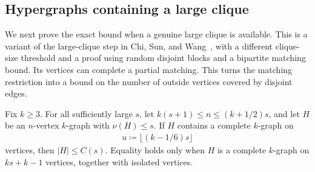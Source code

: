\subsection{Hypergraphs containing a large clique}

We next prove the exact bound when a genuine large clique is available. This is a variant of the large-clique step in Chi, Sun, and Wang~\cite[Lemma 8.7]{CSW2026}, with a different clique-size threshold and a proof using random disjoint blocks and a bipartite matching bound. Its vertices can complete a partial matching. This turns the matching restriction into a bound on the number of outside vertices covered by disjoint edges.
\begin{lemma}\label{lem:local-clique}
Fix $k\ge3$. For all sufficiently large $s$, let $k(s+1)\le n\le(k+1/2)s$, and let $H$ be an $n$-vertex $k$-graph with $\nu(H)\le s$. If $H$ contains a complete $k$-graph on
\begin{align*}
u\coloneqq\lfloor(k-1/6)s\rfloor
\end{align*}
vertices, then $|H|\le C(s)$. Equality holds only when $H$ is a complete $k$-graph on $ks+k-1$ vertices, together with isolated vertices.
\end{lemma}
